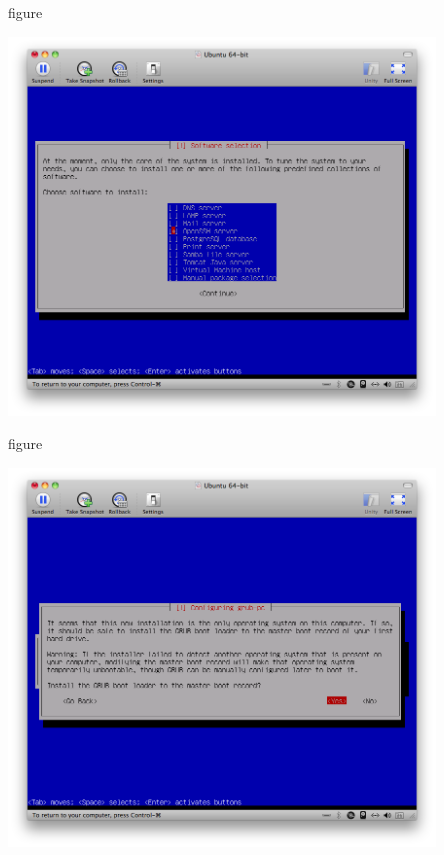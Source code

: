 \begin{nofloat}{figure}
\begin{center}
\includegraphics[width=0.85\textwidth]{screenshots/35_ubuntu_install.png}
\end{center}
\end{nofloat}

\begin{nofloat}{figure}
\begin{center}
\includegraphics[width=0.85\textwidth]{screenshots/36_ubuntu_install.png}
\end{center}
\end{nofloat}

